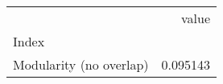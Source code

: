 \begin{tabular}{lr}
\toprule
{} &     value \\
Index                   &           \\
\midrule
Modularity (no overlap) &  0.095143 \\
\bottomrule
\end{tabular}
